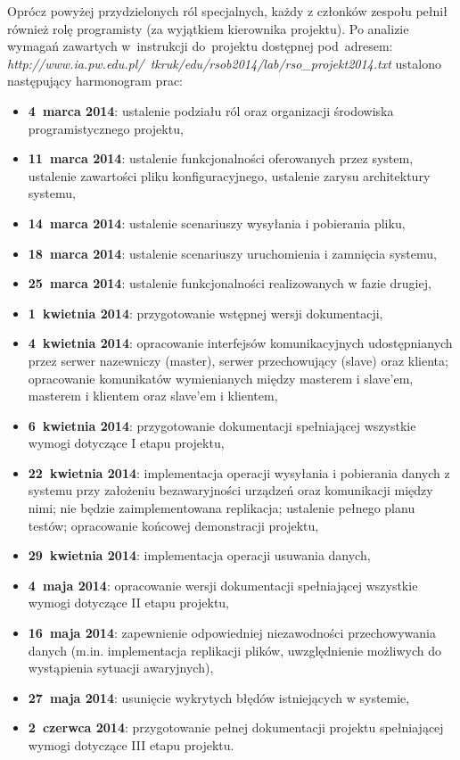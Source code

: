 Oprócz powyżej przydzielonych ról specjalnych, każdy z członków zespołu pełnił
również rolę programisty (za wyjątkiem kierownika projektu). Po analizie wymagań
zawartych w~instrukcji do~projektu dostępnej pod~adresem:
\emph{http://www.ia.pw.edu.pl/~tkruk/edu/rsob2014/lab/rso\_projekt2014.txt}
ustalono następujący harmonogram prac:
\begin{itemize}
  \item \textbf{4~marca 2014}: ustalenie podziału ról oraz organizacji
  środowiska programistycznego projektu,
  \item \textbf{11~marca 2014}: ustalenie funkcjonalności oferowanych przez
  system, ustalenie zawartości pliku konfiguracyjnego, ustalenie zarysu architektury systemu,
  \item \textbf{14~marca 2014}: ustalenie scenariuszy wysyłania i pobierania
  pliku,
  \item \textbf{18~marca 2014}: ustalenie scenariuszy uruchomienia i zamnięcia
  systemu,
  \item \textbf{25~marca 2014}: ustalenie funkcjonalności realizowanych w fazie
  drugiej,
  \item \textbf{1~kwietnia 2014}: przygotowanie wstępnej wersji dokumentacji,
  \item \textbf{4~kwietnia 2014}: opracowanie interfejsów komunikacyjnych
  udostępnianych przez serwer nazewniczy (master), serwer przechowujący (slave) oraz klienta;
  opracowanie komunikatów wymienianych między masterem i slave’em, masterem i
  klientem oraz slave’em i klientem,
  \item \textbf{6~kwietnia 2014}: przygotowanie dokumentacji spełniającej
  wszystkie wymogi dotyczące I etapu projektu,
  \item \textbf{22~kwietnia 2014}: implementacja operacji wysyłania i pobierania
  danych z systemu przy założeniu bezawaryjności urządzeń oraz komunikacji między
  nimi; nie będzie zaimplementowana replikacja; ustalenie pełnego planu testów;
  opracowanie końcowej demonstracji projektu,
  \item \textbf{29~kwietnia 2014}: implementacja operacji usuwania danych,
  \item \textbf{4~maja 2014}: opracowanie wersji dokumentacji spełniającej
  wszystkie wymogi dotyczące II etapu projektu,
  \item \textbf{16~maja 2014}: zapewnienie odpowiedniej niezawodności
  przechowywania danych (m.in. implementacja replikacji plików, uwzględnienie możliwych do
  wystąpienia sytuacji awaryjnych),
  \item \textbf{27~maja 2014}: usunięcie wykrytych błędów istniejących w
  systemie,
  \item \textbf{2~czerwca 2014}: przygotowanie pełnej dokumentacji projektu
  spełniającej wymogi dotyczące III etapu projektu.
\end{itemize}
